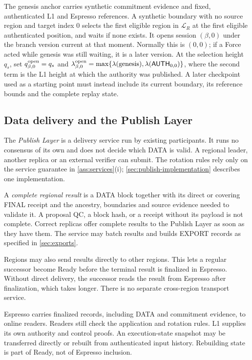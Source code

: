 \documentclass[11pt,a4paper]{article}
\newcommand{\tagg}[1]{\ensuremath{\mathsf{#1}}}
\newcommand{\defterm}[1]{\textcolor{rrBlue}{\textit{#1}}}
\begin{document}
The genesis anchor carries synthetic commitment evidence and fixed,
authenticated L1 and Espresso references. A synthetic boundary with
no source region and target index 0 selects the first
eligible region in $\mathcal L_R$ at the first eligible authenticated
position, and waits if none exists. It opens session $(\beta,0)$ under
the branch version current at that moment. Normally this is $(0,0)$; if
a Force acted while genesis was still waiting, it is a later version.
At the selection height $q_s$, set $q^{\rm open}_{\beta,0}=q_s$ and
$\lambda^{\rm open}_{\beta,0}=\max\{\lambda(\text{genesis}),
\lambda(\tagg{AUTH}_{0,0})\}$, where the second term is the L1 height
at which the authority was published. A later checkpoint used as a
starting point must instead include its current boundary, its reference
bounds and the complete replay state.

\subsection{Data delivery and the Publish Layer}
\label{sec:delivery}
The \defterm{Publish Layer} is a delivery service run by existing
participants. It runs no consensus of its own and does not decide which
DATA is valid. A regional leader, another replica or an external
verifier can submit. The rotation rules rely only on the service
guarantee in \cref{ass:services}(i); \cref{sec:publish-implementation}
describes one implementation.

A \defterm{complete regional result} is a DATA block together with its
direct or covering FINAL receipt and the ancestry, boundaries and source
evidence needed to validate it. A proposal QC, a block hash, or a receipt
without its payload is not complete. Correct replicas offer complete
results to the Publish Layer as soon as they have them. The service may
batch results and builds EXPORT records as specified in
\cref{sec:exports}.

Regions may also send results directly to other regions. This lets a
regular successor become Ready before the terminal result is finalized
in Espresso. Without direct delivery, the successor reads the result
from Espresso after finalization, which takes longer. There is no
separate cross-region transport service.

Espresso carries finalized records, including DATA and commitment
evidence, to online readers. Readers still check the application and
rotation rules. L1 supplies its own authority and control proofs. An
execution-state snapshot may be transferred directly or rebuilt from
authenticated input history. Rebuilding state is part of Ready,
not of Espresso inclusion.
\end{document}
